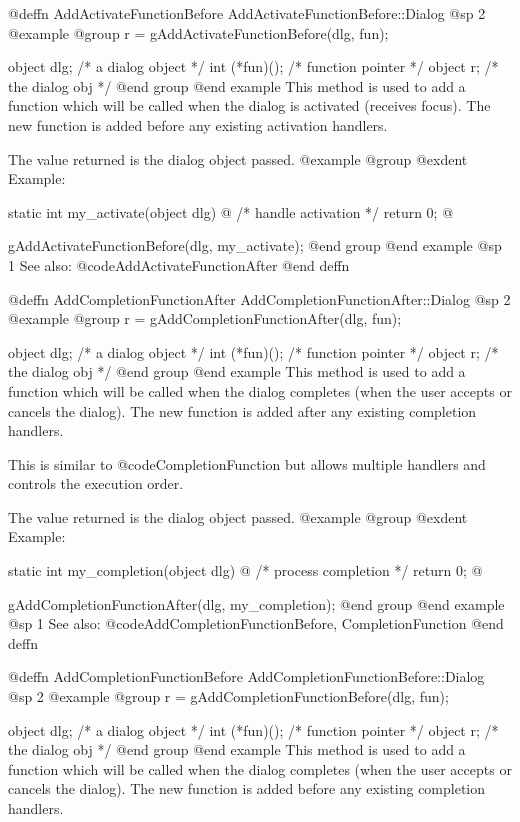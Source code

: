 @deffn {AddActivateFunctionBefore} AddActivateFunctionBefore::Dialog
@sp 2
@example
@group
r = gAddActivateFunctionBefore(dlg, fun);

object  dlg;        /*  a dialog object   */
int     (*fun)();   /*  function pointer  */
object  r;          /*  the dialog obj    */
@end group
@end example
This method is used to add a function which will be called when the dialog
is activated (receives focus).  The new function is added before any existing
activation handlers.

The value returned is the dialog object passed.
@example
@group
@exdent Example:

static int  my_activate(object dlg)
@{
        /*  handle activation  */
        return 0;
@}

gAddActivateFunctionBefore(dlg, my_activate);
@end group
@end example
@sp 1
See also:  @code{AddActivateFunctionAfter}
@end deffn




@deffn {AddCompletionFunctionAfter} AddCompletionFunctionAfter::Dialog
@sp 2
@example
@group
r = gAddCompletionFunctionAfter(dlg, fun);

object  dlg;        /*  a dialog object   */
int     (*fun)();   /*  function pointer  */
object  r;          /*  the dialog obj    */
@end group
@end example
This method is used to add a function which will be called when the dialog
completes (when the user accepts or cancels the dialog).  The new function
is added after any existing completion handlers.

This is similar to @code{CompletionFunction} but allows multiple handlers
and controls the execution order.

The value returned is the dialog object passed.
@example
@group
@exdent Example:

static int  my_completion(object dlg)
@{
        /*  process completion  */
        return 0;
@}

gAddCompletionFunctionAfter(dlg, my_completion);
@end group
@end example
@sp 1
See also:  @code{AddCompletionFunctionBefore, CompletionFunction}
@end deffn




@deffn {AddCompletionFunctionBefore} AddCompletionFunctionBefore::Dialog
@sp 2
@example
@group
r = gAddCompletionFunctionBefore(dlg, fun);

object  dlg;        /*  a dialog object   */
int     (*fun)();   /*  function pointer  */
object  r;          /*  the dialog obj    */
@end group
@end example
This method is used to add a function which will be called when the dialog
completes (when the user accepts or cancels the dialog).  The new function
is added before any existing completion handlers.


